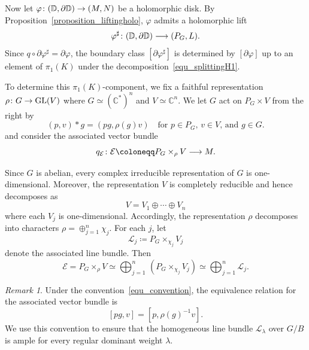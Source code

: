 \documentclass[11pt]{amsart}
\theoremstyle{plain}
\theoremstyle{definition}
\theoremstyle{remark}
\newtheorem{remark}[theorem]{Remark}
\newcommand{\C}{\mathbb{C}}
\numberwithin{equation}{section} \numberwithin{table}{section}
\def\to{\mathchoice{\longrightarrow}{\rightarrow}{\rightarrow}{\rightarrow}}
\numberwithin{equation}{section}
\begin{document}
Now let $\varphi \colon (\mathbb{D}, \partial \mathbb{D}) \to (M, N)$ be a holomorphic disk. By Proposition~\ref{proposition_liftingholo}, $\varphi$  admits a holomorphic lift 
$$
{\varphi^\sharp} \colon (\mathbb{D}, \partial \mathbb{D}) \to (P_{G}, L).
$$ 
Since $q \circ \partial {\varphi^\sharp} = \partial {\varphi}$, the boundary class $[\partial \varphi^\sharp]$ is determined by $[\partial \varphi]$ up to an element of $\pi_1(K)$ under the decomposition~\eqref{equ_splittingH1}.

To determine this $\pi_1(K)$-component, we fix a faithful representation $\rho \colon {G} \to \mathrm{GL}(V)$ where $G \simeq (\C^*)^n$ and $V \simeq \C^n$. We let  $G$ act on $P_G \times V$ from the right by 
\begin{equation}\label{equ_convention}
(p, v) * g = (pg, \rho(g) v) \quad \mbox{for $p \in P_G$, $v \in V$, and $g \in G$.}
\end{equation}
and consider the associated vector bundle 
$$
q_\mathcal{E} \colon \mathcal{E} \coloneqq P_{G} \times_\rho V \to M.
$$

Since $G$ is abelian, every complex irreducible representation of $G$ is one-dimensional. Moreover, the representation $V$ is completely reducible and hence decomposes as 
\begin{equation}\label{equ_decompositionvi}
V = V_1 \oplus \cdots \oplus V_n
\end{equation}
where each $V_j$ is one-dimensional.  Accordingly, the representation $\rho$ decomposes into characters $\rho = \oplus_{j=1}^n \chi_j$. For each $j$, let
\begin{equation}\label{equ_linebundleasso}
\mathcal{L}_j \coloneqq {P}_{G} \times_{\chi_j} V_j
\end{equation}
denote the associated line bundle. Then 
\begin{equation}\label{equ_bundleproj}
\mathcal{E} = {P}_{G} \times_\rho V \simeq \bigoplus_{j=1}^n \, ({P}_{G} \times_{\chi_j} V_j) \simeq \bigoplus_{j=1}^n \mathcal{L}_j.
\end{equation}

\begin{remark}\label{remark_conventions}
Under the convention~\eqref{equ_convention}, the equivalence relation for the associated vector bundle is
\begin{equation}\label{equ_equivalencerelations}
[pg,v] = [p,\rho(g)^{-1}v].
\end{equation}
We use this convention to ensure that the homogeneous line bundle $\mathcal{L}_\lambda$ over $G/B$ is ample for every regular dominant weight $\lambda$.
\end{remark}
\end{document}
